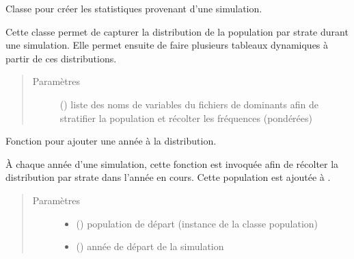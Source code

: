 \documentclass[letterpaper,10pt,french]{sphinxmanual}
\begin{document}
\begin{fulllineitems}
\label{\detokenize{code:simgen.statistics}}
Classe pour créer les statistiques provenant d’une simulation.

Cette classe permet de capturer la distribution de la population par strate durant une simulation. Elle permet ensuite de faire plusieurs tableaux dynamiques à partir de ces distributions.
\begin{quote}\begin{description}
\item[{Paramètres}] \leavevmode
{} () \textendash{} liste des noms de variables du fichiers de dominants afin de stratifier la population et récolter les fréquences (pondérées)

\end{description}\end{quote}

\begin{fulllineitems}
\label{\detokenize{code:simgen.statistics.add}}
Fonction pour ajouter une année à la distribution.

À chaque année d’une simulation, cette fonction est invoquée afin de récolter la distribution par strate dans l’année en cours. Cette population est ajoutée à .
\begin{quote}\begin{description}
\item[{Paramètres}] \leavevmode\begin{itemize}
\item {} 
 ({\hyperref[\detokenize{code:simgen.population}]{}}) \textendash{} population de départ (instance de la classe population)

\item {} 
 () \textendash{} année de départ de la simulation


\end{itemize}
\end{description}
\end{quote}
\end{fulllineitems}
\end{fulllineitems}
\end{document}
